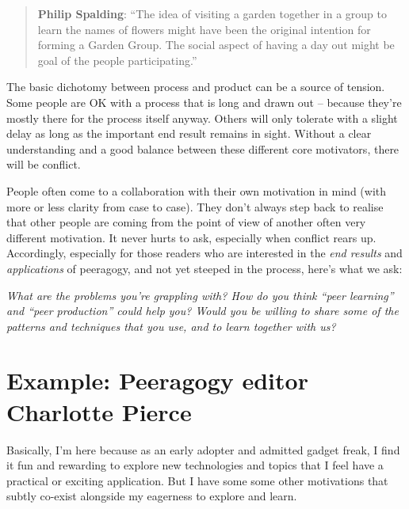 \begin{quote}
\textbf{Philip Spalding}: ``The idea of visiting a garden together in
a group to learn the names of flowers might have been the original
intention for forming a Garden Group. The social aspect of having a
day out might be goal of the people participating.''
\end{quote}

The basic dichotomy between process and product can be a source of
tension.  Some people are OK with a process that is long and drawn out
-- because they’re mostly there for the process itself anyway.  Others
will only tolerate with a slight delay as long as the important end
result remains in sight.  Without a clear understanding and a good
balance between these different core motivators, there will be
conflict.

People often come to a collaboration with their own motivation in mind
(with more or less clarity from case to case).  They don’t always step
back to realise that other people are coming from the point of view of
another often very different motivation.  It never hurts to ask,
especially when conflict rears up.  Accordingly, especially for those
readers who are interested in the \emph{end results} and
\emph{applications} of peeragogy, and not yet steeped in the process,
here's what we ask:

\begin{mdframed}
\emph{What are the problems you're grappling with?  How do you think
  ``peer learning'' and ``peer production'' could help you?  Would you
  be willing to share some of the patterns and techniques that you
  use, and to learn together with us?}
\end{mdframed}






\section*{Example: Peeragogy editor Charlotte Pierce}

Basically, I'm here because as an early adopter and admitted gadget
freak, I find it fun and rewarding to explore new technologies and
topics that I feel have a practical or exciting application. But I have
some some other motivations that subtly co-exist alongside my eagerness
to explore and learn.

